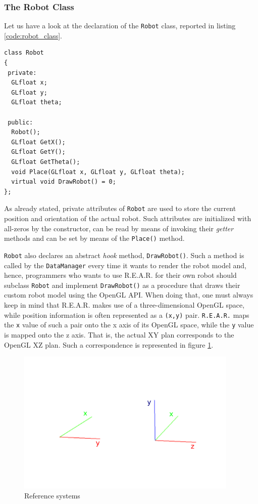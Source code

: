 \subsubsection{The Robot Class}
\label{sub:robotclass}
Let us have a look at the declaration of the \texttt{Robot}
class, reported in listing \ref{code:robot_class}.
%
\begin{lstlisting}[caption={\texttt{Robot} class declaration}, label={code:robot_class}, frame=trBL]
class Robot
{
 private:
  GLfloat x;
  GLfloat y;					
  GLfloat theta;

 public:
  Robot();
  GLfloat GetX();
  GLfloat GetY();
  GLfloat GetTheta();
  void Place(GLfloat x, GLfloat y, GLfloat theta);
  virtual void DrawRobot() = 0;
};
\end{lstlisting}
%
As already stated, private attributes of \texttt{Robot} 
are used to store the current position and orientation 
of the actual robot. Such attributes are initialized with 
all-zeros by the constructor, can be read by means 
of invoking their \textit{getter} methods and can be set 
by means of the \texttt{Place()} method.
%

%
\texttt{Robot} also declares an abstract \textit{hook} method, 
\texttt{DrawRobot()}. Such a method is called by the 
\texttt{DataManager} every time it wants to render the 
robot model and, hence, programmers who wants to 
use \textsf{R.E.A.R.} for their own robot should subclass 
\texttt{Robot} and implement \texttt{DrawRobot()} as a 
procedure that draws their custom robot model using 
the OpenGL API.
%
When doing that, one must always keep in mind that 
\textsf{R.E.A.R.} makes use of a three-dimensional OpenGL 
space, while position information is often represented 
as a \texttt{(x,y)} pair. \texttt{R.E.A.R.} maps the \texttt{x} 
value of such a pair onto the x axis of its OpenGL space, 
while the \texttt{y} value is mapped onto the z axis.
%
That is, the actual XY plan corresponds to the OpenGL 
XZ plan. Such a correspondence is represented in figure 
\ref{fig:reference_systems}.
%
\begin{figure}[!h]
  \begin{center}
    \includegraphics[width=300pt]{img/reference_system.png}
    \caption{Reference systems}
    \label{fig:reference_systems}
  \end{center}
\end{figure}
%

